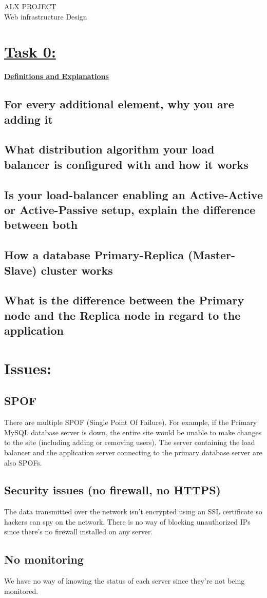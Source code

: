 \documentclass[a4paper, 10pt]{article}
\begin{document}
\justifying
    \begin{center}
        ALX PROJECT \\
        Web infrastructure Design 
    \end{center}
\section*{\underline{Task 0:}}
    \large
    \textbf{\underline{ Definitions and Explanations}}
    \subsection*{For every additional element, why you are adding it}
    \subsection*{What distribution algorithm your load balancer is configured with and how it works}
    \subsection*{Is your load-balancer enabling an Active-Active or Active-Passive setup, explain the difference between both}
    \subsection*{How a database Primary-Replica (Master-Slave) cluster works}
    \subsection*{What is the difference between the Primary node and the Replica node in regard to the application}
\section*{Issues: }
    \subsection*{SPOF}
        There are multiple SPOF (Single Point Of Failure).
        For example, if the Primary MySQL database server is down, 
        the entire site would be unable to make changes to the site (including adding or removing users).
        The server containing the load balancer and the application server connecting to the primary database server are also SPOFs.
    \subsection*{Security issues (no firewall, no HTTPS)}
        The data transmitted over the network isn't encrypted using an SSL certificate so hackers 
        can spy on the network. There is no way of blocking unauthorized IPs since there's no 
        firewall installed on any server.
    \subsection*{No monitoring}
        We have no way of knowing the status of
        each server since they're not being monitored.
\end{document}
